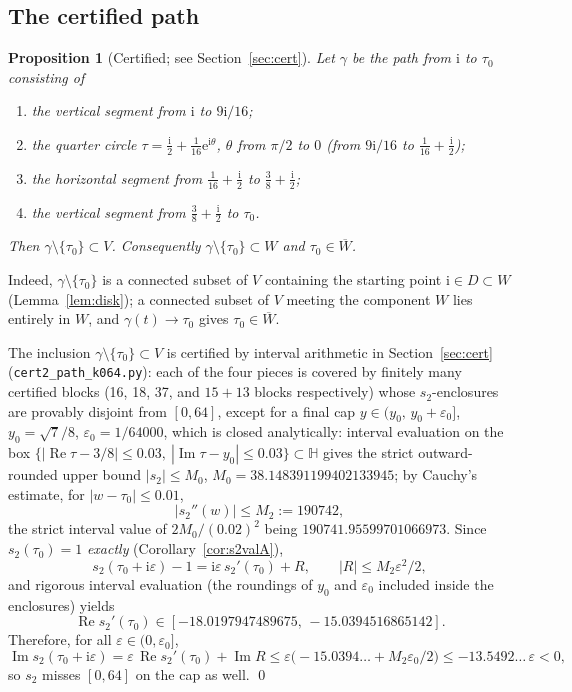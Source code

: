 \documentclass[11pt]{article}
\newtheorem{proposition}[theorem]{Proposition}
\theoremstyle{definition}
\theoremstyle{remark}
\newcommand{\Hh}{\mathbb{H}}
\newcommand{\ii}{\mathrm{i}}
\newcommand{\e}{\mathrm{e}}
\newcommand{\ImT}{\operatorname{Im}}
\newcommand{\ReT}{\operatorname{Re}}
\begin{document}
\subsection{The certified path}\label{subsec:pathA}

\begin{proposition}[Certified; see Section~\ref{sec:cert}]\label{prop:path}
Let $\gamma$ be the path from $\ii$ to $\tau_0$ consisting of
\begin{enumerate}
\item[\textup{(i)}] the vertical segment from $\ii$ to $9\ii/16$;
\item[\textup{(ii)}] the quarter circle $\tau=\tfrac{\ii}{2}+\tfrac1{16}\e^{\ii\theta}$,
  $\theta$ from $\pi/2$ to $0$ \textup{(}from $9\ii/16$ to
  $\tfrac1{16}+\tfrac{\ii}{2}$\textup{)};
\item[\textup{(iii)}] the horizontal segment from $\tfrac1{16}+\tfrac{\ii}{2}$
  to $\tfrac38+\tfrac{\ii}{2}$;
\item[\textup{(iv)}] the vertical segment from $\tfrac38+\tfrac{\ii}{2}$ to $\tau_0$.
\end{enumerate}
Then $\gamma\setminus\{\tau_0\}\subset V$. Consequently
$\gamma\setminus\{\tau_0\}\subset W$ and $\tau_0\in\overline{W}$.
\end{proposition}

Indeed, $\gamma\setminus\{\tau_0\}$ is a connected subset of $V$ containing
the starting point $\ii\in D\subset W$ (Lemma~\ref{lem:disk}); a connected
subset of $V$ meeting the component $W$ lies entirely in $W$, and
$\gamma(t)\to\tau_0$ gives $\tau_0\in\overline{W}$.

The inclusion $\gamma\setminus\{\tau_0\}\subset V$ is certified by
interval arithmetic in Section~\ref{sec:cert}
(\texttt{cert2\_path\_k064.py}): each of the four pieces is covered by
finitely many certified blocks (16, 18, 37, and $15+13$ blocks
respectively) whose $s_2$-enclosures are provably disjoint from $[0,64]$,
except for a final cap $y\in(y_0,\,y_0+\varepsilon_0]$,
$y_0=\sqrt7/8$, $\varepsilon_0=1/64000$, which is closed analytically:
interval evaluation on the box
$\{|\ReT\tau-3/8|\le0.03,\ |\ImT\tau-y_0|\le0.03\}\subset\Hh$ gives
the strict outward-rounded upper bound
$|s_2|\le M_0$, $M_0=38.148391199402133945$;
by Cauchy's estimate, for
$|w-\tau_0|\le0.01$,
\[
  |s_2''(w)|\le M_2:=190742 ,
\]
the strict interval value of $2M_0/(0.02)^2$ being $190741.95599701066973$.
Since $s_2(\tau_0)=1$ \emph{exactly} (Corollary~\ref{cor:s2valA}),
\[
  s_2(\tau_0+\ii\varepsilon)-1=\ii\varepsilon\,s_2'(\tau_0)+R,
  \qquad |R|\le M_2\varepsilon^2/2,
\]
and rigorous interval evaluation (the roundings of $y_0$ and
$\varepsilon_0$ included inside the enclosures) yields
\[
  \ReT s_2'(\tau_0)\in[-18.0197947489675,\,-15.0394516865142].
\]
Therefore, for all $\varepsilon\in(0,\varepsilon_0]$,
\begin{equation}\label{eq:cap}
  \ImT s_2(\tau_0+\ii\varepsilon)
  =\varepsilon\,\ReT s_2'(\tau_0)+\ImT R
  \le\varepsilon\bigl(-15.0394\ldots+M_2\varepsilon_0/2\bigr)
  \le -13.5492\ldots\,\varepsilon<0,
\end{equation}
so $s_2$ misses $[0,64]$ on the cap as well. \qed
\end{document}
